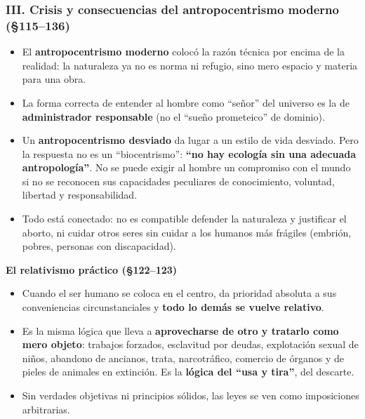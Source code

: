 \documentclass[10pt,a4paper]{article}
\begin{document}
\subsubsection{III. Crisis y consecuencias del antropocentrismo moderno (\S{}115--136)}
\begin{itemize}
\item El \textbf{antropocentrismo moderno} colocó la razón técnica por encima de la realidad: la naturaleza ya no es norma ni refugio, sino mero espacio y materia para una obra.
\item La forma correcta de entender al hombre como ``señor'' del universo es la de \textbf{administrador responsable} (no el ``sueño prometeico'' de dominio).
\item Un \textbf{antropocentrismo desviado} da lugar a un estilo de vida desviado. Pero la respuesta no es un ``biocentrismo'': \textbf{``no hay ecología sin una adecuada antropología''}. No se puede exigir al hombre un compromiso con el mundo si no se reconocen sus capacidades peculiares de conocimiento, voluntad, libertad y responsabilidad.
\item Todo está conectado: no es compatible defender la naturaleza y justificar el aborto, ni cuidar otros seres sin cuidar a los humanos más frágiles (embrión, pobres, personas con discapacidad).
\end{itemize}

\medskip\noindent \textbf{El relativismo práctico (\S{}122--123)}\par\nopagebreak
\begin{itemize}
\item Cuando el ser humano se coloca en el centro, da prioridad absoluta a sus conveniencias circunstanciales y \textbf{todo lo demás se vuelve relativo}.
\item Es la misma lógica que lleva a \textbf{aprovecharse de otro y tratarlo como mero objeto}: trabajos forzados, esclavitud por deudas, explotación sexual de niños, abandono de ancianos, trata, narcotráfico, comercio de órganos y de pieles de animales en extinción. Es la \textbf{lógica del ``usa y tira''}, del descarte.
\item Sin verdades objetivas ni principios sólidos, las leyes se ven como imposiciones arbitrarias.
\end{itemize}
\end{document}
